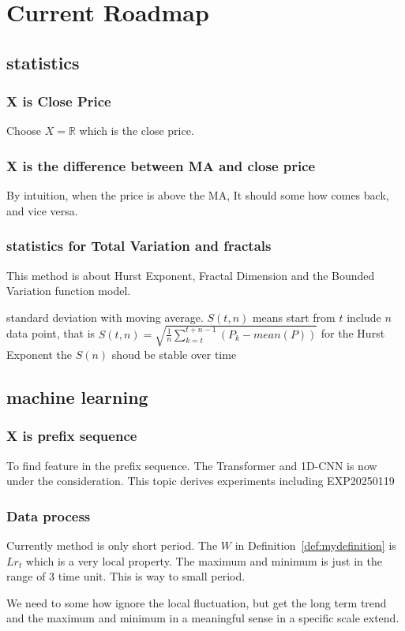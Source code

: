 \documentclass{article}
\theoremstyle{definition} %
\begin{document}
\section{Current Roadmap}
\subsection{statistics}
\subsubsection{X is Close Price}
Choose $X=\mathbb{R}$ which is the close price.
\subsubsection{X is the difference between MA and close price}
By intuition, when the price is above the MA,
It should some how comes back, and vice versa.
\subsubsection{statistics for Total Variation and fractals}
This method is about Hurst Exponent,
Fractal Dimension and the Bounded Variation
function model.

standard deviation with moving average.
$S(t,n)$ means start from
$t$ include $n$ data point,
that is
$S(t,n)=\sqrt{\frac{1}{n}\sum_{k=t}^{t+n-1}
        \left(P_k-mean(P)\right)}$
for the Hurst Exponent the $S(n)$ shoud be
stable over time

\subsection{machine learning}
\subsubsection{X is prefix sequence}
To find feature in the prefix sequence. The
Transformer and 1D-CNN is now under
the consideration.
This topic derives experiments including
EXP20250119

\subsubsection{Data process}
Currently method is only short period.
The $W$ in Definition~\ref{def:mydefinition}
is $Lr_t$ which is a very local property.
The maximum and minimum is just in the range
of $3$ time unit. This is way to small period.

We need to some how ignore the local fluctuation,
but get the long term trend and the maximum
and minimum in a meaningful sense in
a specific scale extend.
\end{document}
